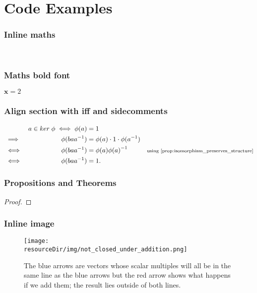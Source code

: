 \documentclass[MathsNotesBase.tex]{subfiles}
\date{\vspace{-6ex}}
\begin{document}
	\chapter*{Code Examples}
	
	\subsection{Inline maths}
	${}$ %
	${\bm{}}$ %
	
	\subsection{Maths bold font}
	$\bm{x} = 2$
	
	\subsection{Align section with iff and sidecomments}
	\[\begin{aligned}
		&& a \in ker \; \phi \iff \phi(a) &= 1 \\
		&\implies & \phi(ba\inv{a}) &= \phi(a) \cdot 1 \cdot \phi(\inv{a}) \\
		&\iff & \phi(ba\inv{a}) &= \phi(a)\inv{\phi(a)} &\sidecomment{using \autoref{prop:isomorphism_preserves_structure}} \\
		&\iff & \phi(ba\inv{a}) &= 1.
	\end{aligned}\]

	\subsection{Propositions and Theorems}
	\begin{proof}
	\end{proof}
	
	\subsection{Inline image}
	\begin{figure}[h!]
		\texttt{[image: \\resourceDir/img/not\_closed\_under\_addition.png]}
		\caption{The blue arrows are vectors whose scalar multiples will all be in the same line as the blue arrows but the red arrow shows what happens if we add them; the result lies outside of both lines.}
		\label{fig:label-must-go-here}
	\end{figure}
\end{document}
